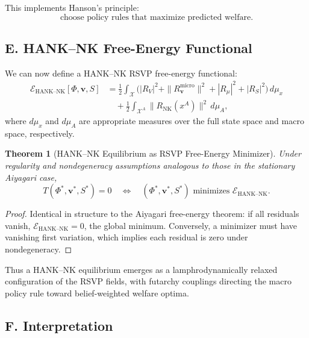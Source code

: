 \documentclass[12pt]{article}
\newtheorem{theorem}{Theorem}
\begin{document}
This implements Hanson’s principle:
\[
\text{choose policy rules that maximize predicted welfare}.
\]

\subsection*{E. HANK--NK Free-Energy Functional}

We can now define a HANK--NK RSVP free-energy functional:
\begin{align}
\mathcal{E}_{\text{HANK--NK}}[\Phi,\mathbf{v},S]
&=
\frac{1}{2}
\int_{\mathcal{X}}
\Big(
    |R_V|^2
  + \|R_{\mathbf{v}}^{\text{micro}}\|^2
  + |R_\mu|^2
  + |R_S|^2
\Big)\,d\mu_x
\\[4pt]
&\quad
+ \frac{1}{2}
\int_{\mathcal{X}^A}
\|R_{\text{NK}}(x^A)\|^2\, d\mu_A,
\end{align}
where $d\mu_x$ and $d\mu_A$ are appropriate measures over the full
state space and macro space, respectively.

\begin{theorem}[HANK--NK Equilibrium as RSVP Free-Energy Minimizer]
Under regularity and nondegeneracy assumptions analogous to those in
the stationary Aiyagari case,
\[
T(\Phi^\ast,\mathbf{v}^\ast,S^\ast)=0
\quad\Longleftrightarrow\quad
(\Phi^\ast,\mathbf{v}^\ast,S^\ast)
\text{ minimizes }
\mathcal{E}_{\text{HANK--NK}}.
\]
\end{theorem}

\begin{proof}
Identical in structure to the Aiyagari free-energy theorem: if all
residuals vanish, $\mathcal{E}_{\text{HANK--NK}}=0$, the global minimum.
Conversely, a minimizer must have vanishing first variation, which
implies each residual is zero under nondegeneracy.
\end{proof}

Thus a HANK--NK equilibrium emerges as a lamphrodynamically relaxed
configuration of the RSVP fields, with futarchy couplings directing the
macro policy rule toward belief-weighted welfare optima.

\subsection*{F. Interpretation}
\end{document}
